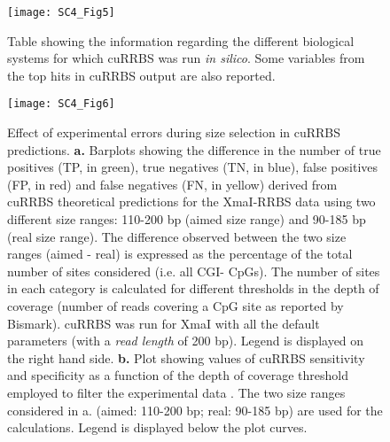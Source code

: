 \begin{figure}[htbp!] 
	\centering    
	\texttt{[image: SC4\_Fig5]}
	\caption[Additional results of running cuRRBS in different biological systems]{Table showing the information regarding the different biological systems \cite{Horvath2013,Hanna2016,Milagre2017,Kawakatsu2016,Maurano2015,LevMaor2015,Domcke2015} for which cuRRBS was run \textit{in silico}. Some variables from the top hits in cuRRBS output are also reported.}
	\label{fig:sc4_fig5}
\end{figure}

\begin{figure}[htbp!] 
	\centering    
	\texttt{[image: SC4\_Fig6]}
	\vspace*{2mm}
	\caption[Effect of experimental errors during size selection in cuRRBS predictions]{Effect of experimental errors during size selection in cuRRBS predictions. \textbf{a.} Barplots showing the difference in the number of true positives (TP, in green), true negatives (TN, in blue), false positives (FP, in red) and false negatives (FN, in yellow) derived from cuRRBS theoretical predictions for the XmaI-RRBS data \cite{Tanas2017} using two different size ranges: 110-200 bp (aimed size range) and 90-185 bp (real size range). The difference observed between the two size ranges (aimed - real) is expressed as the percentage of the total number of sites considered (i.e. all CGI- CpGs). The number of sites in each category is calculated for different thresholds in the depth of coverage (number of reads covering a CpG site as reported by Bismark). cuRRBS was run for XmaI with all the default parameters (with a \textit{read length} of 200 bp). Legend is displayed on the right hand side. \textbf{b.} Plot showing values of cuRRBS sensitivity and specificity as a function of the depth of coverage threshold employed to filter the experimental data \cite{Tanas2017}. The two size ranges considered in a. (aimed: 110-200 bp; real: 90-185 bp) are used for the calculations. Legend is displayed below the plot curves.}
	\label{fig:sc4_fig6}
\end{figure}

